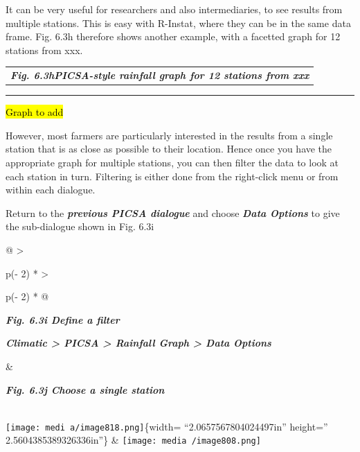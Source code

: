 \documentclass[
  letterpaper,
  DIV=11,
  numbers=noendperiod]{scrreprt}
\begin{document}
It can be very useful for researchers and also intermediaries, to see
results from multiple stations. This is easy with R-Instat, where they
can be in the same data frame. Fig. 6.3h therefore shows another
example, with a facetted graph for 12 stations from xxx.

\begin{longtable}[]{@{}l@{}}
\toprule\noalign{}
\endhead
\bottomrule\noalign{}
\endlastfoot
\textbf{\emph{Fig. 6.3hPICSA-style rainfall graph for 12 stations from
xxx}} \\
\end{longtable}

\begin{center}\rule{0.5\linewidth}{0.5pt}\end{center}

\hl{Graph to add}

However, most farmers are particularly interested in the results from a
single station that is as close as possible to their location. Hence
once you have the appropriate graph for multiple stations, you can then
filter the data to look at each station in turn. Filtering is either
done from the right-click menu or from within each dialogue.

Return to the \textbf{\emph{previous PICSA dialogue}} and choose
\textbf{\emph{Data Options}} to give the sub-dialogue shown in Fig. 6.3i

\begin{longtable}[]{@{}
  >{\raggedright\arraybackslash}p{(\columnwidth - 2\tabcolsep) * }
  >{\raggedright\arraybackslash}p{(\columnwidth - 2\tabcolsep) * }@{}}
\toprule\noalign{}
\begin{minipage}[b]{\linewidth}\raggedright
\textbf{\emph{Fig. 6.3i Define a filter}}

\textbf{\emph{Climatic \textgreater{} PICSA \textgreater{} Rainfall
Graph \textgreater{} Data Options}}
\end{minipage} & \begin{minipage}[b]{\linewidth}\raggedright
\textbf{\emph{Fig. 6.3j Choose a single station}}
\end{minipage} \\
\midrule\noalign{}
\endhead
\bottomrule\noalign{}
\endlastfoot
\texttt{[image: medi a/image818.png]}\{width= ``2.0657567804024497in''
height='' 2.5604385389326336in''\} &
\texttt{[image: media /image808.png]} \\
\end{longtable}
\end{document}
